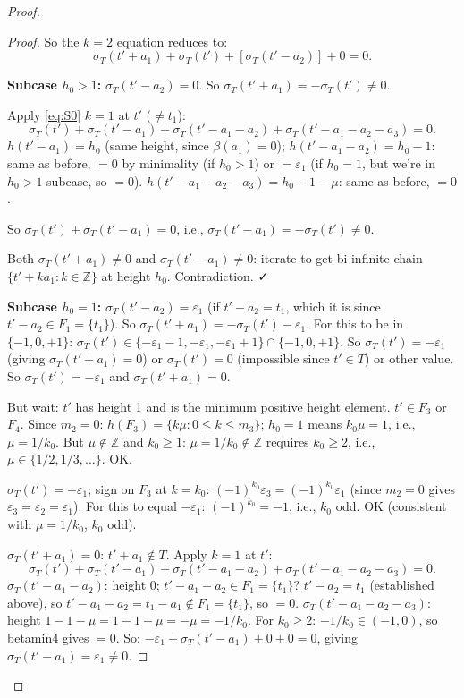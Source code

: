 \begin{proof}
\begin{proof}
So the $k=2$ equation reduces to:
\[
  \sigma_T(t'+a_1)+\sigma_T(t')+[\sigma_T(t'-a_2)]+0=0.
\]

\textbf{Subcase $h_0>1$:} $\sigma_T(t'-a_2)=0$. So $\sigma_T(t'+a_1)=-\sigma_T(t')\neq 0$.

Apply \eqref{eq:S0} $k=1$ at $t'$ ($\neq t_1$):
\[
  \sigma_T(t')+\sigma_T(t'-a_1)+\sigma_T(t'-a_1-a_2)+\sigma_T(t'-a_1-a_2-a_3)=0.
\]
$h(t'-a_1)=h_0$ (same height, since $\beta(a_1)=0$); $h(t'-a_1-a_2)=h_0-1$: same as before, $=0$ by minimality (if $h_0>1$) or $=\varepsilon_1$ (if $h_0=1$, but we're in $h_0>1$ subcase, so $=0$). $h(t'-a_1-a_2-a_3)=h_0-1-\mu$: same as before, $=0$.

So $\sigma_T(t')+\sigma_T(t'-a_1)=0$, i.e., $\sigma_T(t'-a_1)=-\sigma_T(t')\neq 0$.

Both $\sigma_T(t'+a_1)\neq 0$ and $\sigma_T(t'-a_1)\neq 0$: iterate to get bi-infinite chain $\{t'+ka_1:k\in\mathbb{Z}\}$ at height $h_0$. Contradiction. ✓

\textbf{Subcase $h_0=1$:} $\sigma_T(t'-a_2)=\varepsilon_1$ (if $t'-a_2=t_1$, which it is since $t'-a_2\in F_1=\{t_1\}$). So $\sigma_T(t'+a_1)=-\sigma_T(t')-\varepsilon_1$. For this to be in $\{-1,0,+1\}$: $\sigma_T(t') \in \{-\varepsilon_1-1,-\varepsilon_1,-\varepsilon_1+1\} \cap \{-1,0,+1\}$. So $\sigma_T(t')=-\varepsilon_1$ (giving $\sigma_T(t'+a_1)=0$) or $\sigma_T(t')=0$ (impossible since $t'\in T$) or other value. So $\sigma_T(t')=-\varepsilon_1$ and $\sigma_T(t'+a_1)=0$.

But wait: $t'$ has height 1 and is the minimum positive height element. $t' \in F_3$ or $F_4$. Since $m_2=0$: $h(F_3)=\{k\mu:0\leq k\leq m_3\}$; $h_0=1$ means $k_0\mu=1$, i.e., $\mu=1/k_0$. But $\mu\notin\mathbb{Z}$ and $k_0\geq 1$: $\mu=1/k_0\notin\mathbb{Z}$ requires $k_0\geq 2$, i.e., $\mu\in\{1/2,1/3,\ldots\}$. OK.

$\sigma_T(t')=-\varepsilon_1$; sign on $F_3$ at $k=k_0$: $(-1)^{k_0}\varepsilon_3 = (-1)^{k_0}\varepsilon_1$ (since $m_2=0$ gives $\varepsilon_3=\varepsilon_2=\varepsilon_1$). For this to equal $-\varepsilon_1$: $(-1)^{k_0}=-1$, i.e., $k_0$ odd. OK (consistent with $\mu=1/k_0$, $k_0$ odd).

$\sigma_T(t'+a_1)=0$: $t'+a_1 \notin T$. Apply $k=1$ at $t'$:
\[
  \sigma_T(t')+\sigma_T(t'-a_1)+\sigma_T(t'-a_1-a_2)+\sigma_T(t'-a_1-a_2-a_3)=0.
\]
$\sigma_T(t'-a_1-a_2)$: height $0$; $t'-a_1-a_2\in F_1=\{t_1\}$? $t'-a_2=t_1$ (established above), so $t'-a_1-a_2=t_1-a_1\notin F_1=\{t_1\}$, so $=0$.
$\sigma_T(t'-a_1-a_2-a_3)$: height $1-1-\mu=1-1-\mu=-\mu=-1/k_0$. For $k_0\geq 2$: $-1/k_0\in(-1,0)$, so betamin4 gives $=0$.
So: $-\varepsilon_1+\sigma_T(t'-a_1)+0+0=0$, giving $\sigma_T(t'-a_1)=\varepsilon_1\neq 0$.


\end{proof}
\end{proof}
